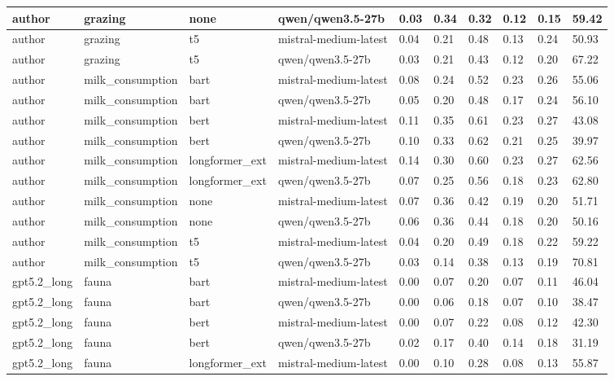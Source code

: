 \begin{tabular}{|l|l|l|l|l|l|l|l|l|l|}
 \hline
 author & grazing & none & qwen/qwen3.5-27b & 0.03 & 0.34 & 0.32 & 0.12 & 0.15 & 59.42 \\
 \hline
 author & grazing & t5 & mistral-medium-latest & 0.04 & 0.21 & 0.48 & 0.13 & 0.24 & 50.93 \\
 \hline
 author & grazing & t5 & qwen/qwen3.5-27b & 0.03 & 0.21 & 0.43 & 0.12 & 0.20 & 67.22 \\
 \hline
 author & milk\_consumption & bart & mistral-medium-latest & 0.08 & 0.24 & 0.52 & 0.23 & 0.26 & 55.06 \\
 \hline
 author & milk\_consumption & bart & qwen/qwen3.5-27b & 0.05 & 0.20 & 0.48 & 0.17 & 0.24 & 56.10 \\
 \hline
 author & milk\_consumption & bert & mistral-medium-latest & 0.11 & 0.35 & 0.61 & 0.23 & 0.27 & 43.08 \\
 \hline
 author & milk\_consumption & bert & qwen/qwen3.5-27b & 0.10 & 0.33 & 0.62 & 0.21 & 0.25 & 39.97 \\
 \hline
 author & milk\_consumption & longformer\_ext & mistral-medium-latest & 0.14 & 0.30 & 0.60 & 0.23 & 0.27 & 62.56 \\
 \hline
 author & milk\_consumption & longformer\_ext & qwen/qwen3.5-27b & 0.07 & 0.25 & 0.56 & 0.18 & 0.23 & 62.80 \\
 \hline
 author & milk\_consumption & none & mistral-medium-latest & 0.07 & 0.36 & 0.42 & 0.19 & 0.20 & 51.71 \\
 \hline
 author & milk\_consumption & none & qwen/qwen3.5-27b & 0.06 & 0.36 & 0.44 & 0.18 & 0.20 & 50.16 \\
 \hline
 author & milk\_consumption & t5 & mistral-medium-latest & 0.04 & 0.20 & 0.49 & 0.18 & 0.22 & 59.22 \\
 \hline
 author & milk\_consumption & t5 & qwen/qwen3.5-27b & 0.03 & 0.14 & 0.38 & 0.13 & 0.19 & 70.81 \\
 \hline
 gpt5.2\_long & fauna & bart & mistral-medium-latest & 0.00 & 0.07 & 0.20 & 0.07 & 0.11 & 46.04 \\
 \hline
 gpt5.2\_long & fauna & bart & qwen/qwen3.5-27b & 0.00 & 0.06 & 0.18 & 0.07 & 0.10 & 38.47 \\
 \hline
 gpt5.2\_long & fauna & bert & mistral-medium-latest & 0.00 & 0.07 & 0.22 & 0.08 & 0.12 & 42.30 \\
 \hline
 gpt5.2\_long & fauna & bert & qwen/qwen3.5-27b & 0.02 & 0.17 & 0.40 & 0.14 & 0.18 & 31.19 \\
 \hline
 gpt5.2\_long & fauna & longformer\_ext & mistral-medium-latest & 0.00 & 0.10 & 0.28 & 0.08 & 0.13 & 55.87 \\

\end{tabular}
